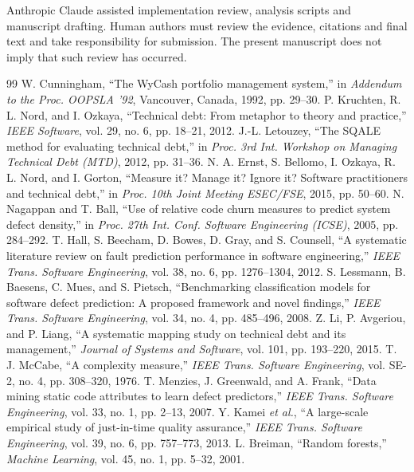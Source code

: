 \documentclass[conference]{IEEEtran}
\begin{document}
Anthropic Claude assisted implementation review, analysis scripts and manuscript drafting. Human authors must review the evidence, citations and final text and take responsibility for submission. The present manuscript does not imply that such review has occurred.

\begin{thebibliography}{99}
 W. Cunningham, ``The WyCash portfolio management system,'' in \textit{Addendum to the Proc. OOPSLA '92}, Vancouver, Canada, 1992, pp. 29--30.
 P. Kruchten, R. L. Nord, and I. Ozkaya, ``Technical debt: From metaphor to theory and practice,'' \textit{IEEE Software}, vol. 29, no. 6, pp. 18--21, 2012.
 J.-L. Letouzey, ``The SQALE method for evaluating technical debt,'' in \textit{Proc. 3rd Int. Workshop on Managing Technical Debt (MTD)}, 2012, pp. 31--36.
 N. A. Ernst, S. Bellomo, I. Ozkaya, R. L. Nord, and I. Gorton, ``Measure it? Manage it? Ignore it? Software practitioners and technical debt,'' in \textit{Proc. 10th Joint Meeting ESEC/FSE}, 2015, pp. 50--60.
 N. Nagappan and T. Ball, ``Use of relative code churn measures to predict system defect density,'' in \textit{Proc. 27th Int. Conf. Software Engineering (ICSE)}, 2005, pp. 284--292.
 T. Hall, S. Beecham, D. Bowes, D. Gray, and S. Counsell, ``A systematic literature review on fault prediction performance in software engineering,'' \textit{IEEE Trans. Software Engineering}, vol. 38, no. 6, pp. 1276--1304, 2012.
 S. Lessmann, B. Baesens, C. Mues, and S. Pietsch, ``Benchmarking classification models for software defect prediction: A proposed framework and novel findings,'' \textit{IEEE Trans. Software Engineering}, vol. 34, no. 4, pp. 485--496, 2008.
 Z. Li, P. Avgeriou, and P. Liang, ``A systematic mapping study on technical debt and its management,'' \textit{Journal of Systems and Software}, vol. 101, pp. 193--220, 2015.
 T. J. McCabe, ``A complexity measure,'' \textit{IEEE Trans. Software Engineering}, vol. SE-2, no. 4, pp. 308--320, 1976.
 T. Menzies, J. Greenwald, and A. Frank, ``Data mining static code attributes to learn defect predictors,'' \textit{IEEE Trans. Software Engineering}, vol. 33, no. 1, pp. 2--13, 2007.
 Y. Kamei \textit{et al.}, ``A large-scale empirical study of just-in-time quality assurance,'' \textit{IEEE Trans. Software Engineering}, vol. 39, no. 6, pp. 757--773, 2013.
 L. Breiman, ``Random forests,'' \textit{Machine Learning}, vol. 45, no. 1, pp. 5--32, 2001.

\end{thebibliography}
\end{document}
